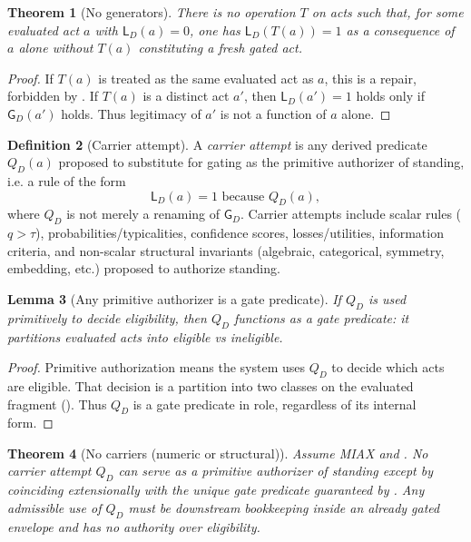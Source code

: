 \documentclass[11pt]{article}
\newtheorem{theorem}{Theorem}[section]
\newtheorem{lemma}[theorem]{Lemma}
\theoremstyle{definition}
\newtheorem{definition}[theorem]{Definition}
\newcommand{\Gate}{\mathsf{G}}
\newcommand{\Stand}{\mathsf{L}}
\begin{document}
\begin{theorem}[No generators]
\label{thm:no-generators}
There is no operation $T$ on acts such that, for some evaluated act $a$ with $\Stand_D(a)=0$, one has $\Stand_D(T(a))=1$ \emph{as a consequence of $a$ alone} without $T(a)$ constituting a fresh gated act.
\end{theorem}

\begin{proof}
If $T(a)$ is treated as the same evaluated act as $a$, this is a repair, forbidden by .
If $T(a)$ is a distinct act $a'$, then $\Stand_D(a')=1$ holds only if $\Gate_D(a')$ holds.
Thus legitimacy of $a'$ is not a function of $a$ alone.
\end{proof}

\begin{definition}[Carrier attempt]
A \emph{carrier attempt} is any derived predicate $Q_D(a)$ proposed to substitute for gating as the primitive authorizer of standing, i.e. a rule of the form
\[ \Stand_D(a)=1 \text{ because } Q_D(a), \]
where $Q_D$ is not merely a renaming of $\Gate_D$.
Carrier attempts include scalar rules ($q>\tau$), probabilities/typicalities, confidence scores, losses/utilities, information criteria, and non-scalar structural invariants (algebraic, categorical, symmetry, embedding, etc.) proposed to authorize standing.
\end{definition}

\begin{lemma}[Any primitive authorizer is a gate predicate]
\label{lem:authorizer-is-gate}
If $Q_D$ is used primitively to decide eligibility, then $Q_D$ functions as a gate predicate: it partitions evaluated acts into eligible vs ineligible.
\end{lemma}

\begin{proof}
Primitive authorization means the system uses $Q_D$ to decide which acts are eligible.
That decision is a partition into two classes on the evaluated fragment ().
Thus $Q_D$ is a gate predicate in role, regardless of its internal form.
\end{proof}

\begin{theorem}[No carriers (numeric or structural)]
\label{thm:no-carriers}
Assume MIAX and .
No carrier attempt $Q_D$ can serve as a primitive authorizer of standing except by coinciding extensionally with the unique gate predicate guaranteed by .
Any admissible use of $Q_D$ must be downstream bookkeeping inside an already gated envelope and has no authority over eligibility.
\end{theorem}
\end{document}
